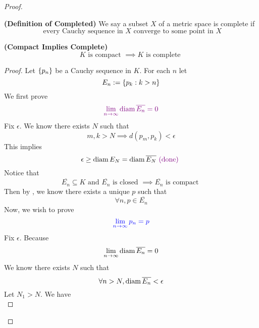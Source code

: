 \documentclass{report}
\begin{document}
\begin{proof}
\begin{definition}
\label{1.13.7}
\textbf{(Definition of Completed)} We say a subset $X$ of a metric space is complete if 
\begin{equation}
\text{ every Cauchy sequence in $X$ converge to some point in $X$}
\end{equation}
\end{definition}
\begin{theorem}
\label{1.13.8}
\textbf{(Compact Implies Complete)} 
\begin{equation}
K\text{ is compact }\implies K\text{ is complete }
\end{equation}
\end{theorem}
\begin{proof}
Let $\{ p_n \}$ be a Cauchy sequence in $K$. For each $n$ let
 \begin{equation}
E_n:=\{ p_k:k> n \}
\end{equation}
We first prove 
\begin{equation}
  \textcolor{violet}{\lim_{n\to\infty}\text{diam}\, \overline{E_n}=0}
\end{equation}
Fix $\epsilon $. We know there exists $N$ such that
 \begin{equation}
m,k>N\implies d(p_m,p_k)<\epsilon 
\end{equation}
This implies
\begin{equation}
\epsilon \geq \text{diam}\, E_N=\text{diam}\, \overline{E_N}\textcolor{violet}{\text{ (done) }}
\end{equation}
Notice that
\begin{equation}
\overline{E_n}\subseteq K\text{ and }\overline{E_n}\text{ is closed }\implies \overline{E_n}\text{ is compact }
\end{equation}
Then by , we know there exists a unique $p$ such that
 \begin{equation}
\forall n, p\in  \overline{E_n}
\end{equation}
Now, we wish to prove
\begin{equation}
  \textcolor{blue}{\lim_{n\to\infty}p_n=p}
\end{equation}
Fix $\epsilon $. Because
\begin{equation} \lim_{n\to\infty}\text{diam}\, \overline{E_n}=0
\end{equation}
We know there exists $N$ such that
 \begin{equation}
\forall n>N, \text{diam}\, \overline{E_n}<\epsilon 
\end{equation}
Let $N_1>N$. We have
 \begin{equation}

\end{equation}
\end{proof}
\end{proof}
\end{document}
